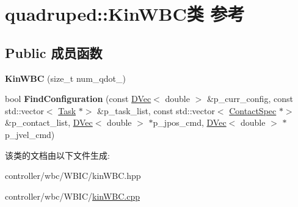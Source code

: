 \hypertarget{classquadruped_1_1KinWBC}{}\section{quadruped\+:\+:Kin\+W\+B\+C类 参考}
\label{classquadruped_1_1KinWBC}
\subsection*{Public 成员函数}
\begin{DoxyCompactItemize}
\item 
\mbox{\label{classquadruped_1_1KinWBC_ac6e9dcce26b2c1b8071978752144e654}} 
{\bfseries Kin\+W\+BC} (size\+\_\+t num\+\_\+qdot\+\_\+)
\item 
\mbox{\label{classquadruped_1_1KinWBC_a8f3ec125df6669ee9251e452e422aefc}} 
bool {\bfseries Find\+Configuration} (const \hyperlink{cppTypes_8h_adad69baca3c77d5f991be5d3c063fea7}{D\+Vec}$<$ double $>$ \&p\+\_\+curr\+\_\+config, const std\+::vector$<$ \hyperlink{classquadruped_1_1Task}{Task} $\ast$$>$ \&p\+\_\+task\+\_\+list, const std\+::vector$<$ \hyperlink{classquadruped_1_1ContactSpec}{Contact\+Spec} $\ast$$>$ \&p\+\_\+contact\+\_\+list, \hyperlink{cppTypes_8h_adad69baca3c77d5f991be5d3c063fea7}{D\+Vec}$<$ double $>$ $\ast$p\+\_\+jpos\+\_\+cmd, \hyperlink{cppTypes_8h_adad69baca3c77d5f991be5d3c063fea7}{D\+Vec}$<$ double $>$ $\ast$p\+\_\+jvel\+\_\+cmd)
\end{DoxyCompactItemize}


该类的文档由以下文件生成\+:\begin{DoxyCompactItemize}
\item 
controller/wbc/\+W\+B\+I\+C/kin\+W\+B\+C.\+hpp\item 
controller/wbc/\+W\+B\+I\+C/\hyperlink{kinWBC_8cpp}{kin\+W\+B\+C.\+cpp}\end{DoxyCompactItemize}
